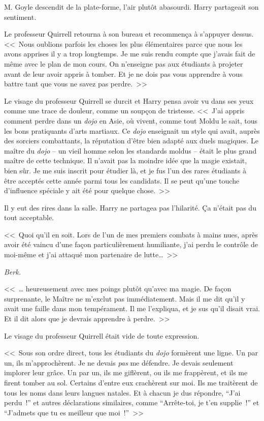 M. Goyle descendit de la plate-forme, l'air plutôt abasourdi. Harry partageait son sentiment.

Le professeur Quirrell retourna à son bureau et recommença à s'appuyer dessus. <<~Nous oublions parfois les choses les plus élémentaires parce que nous les avons apprises il y a trop longtemps. Je me suis rendu compte que j'avais fait de même avec le plan de mon cours. On n'enseigne pas aux étudiants à projeter avant de leur avoir appris à tomber. Et je ne dois pas vous apprendre à vous battre tant que vous ne savez pas perdre.~>>

Le visage du professeur Quirrell se durcit et Harry pensa avoir vu dans ses yeux comme une trace de douleur, comme un soupçon de tristesse. <<~J'ai appris comment perdre dans un \emph{dojo} en Asie, où vivent, comme tout Moldu le sait, tous les bons pratiquants d'arts martiaux. Ce \emph{dojo} enseignait un style qui avait, auprès des sorciers combattants, la réputation d'être bien adapté aux duels magiques. Le maître du \emph{dojo} -- un vieil homme selon les standards moldus -- était le plus grand maître de cette technique. Il n'avait pas la moindre idée que la magie existait, bien sûr. Je me suis inscrit pour étudier là, et je fus l'un des rares étudiants à être acceptés cette année parmi tous les candidats. Il se peut qu'une touche d'influence spéciale y ait été pour quelque chose.~>>

Il y eut des rires dans la salle. Harry ne partagea pas l'hilarité. Ça n'était pas du tout acceptable.

<<~Quoi qu'il en soit. Lors de l'un de mes premiers combats à mains nues, après avoir été vaincu d'une façon particulièrement humiliante, j'ai perdu le contrôle de moi-même et j'ai attaqué mon partenaire de lutte…~>>

\emph{Berk.}

<<~… heureusement avec mes poings plutôt qu'avec ma magie. De façon surprenante, le Maître ne m'exclut pas immédiatement. Mais il me dit qu'il y avait une faille dans mon tempérament. Il me l'expliqua, et je sus qu'il disait vrai. Et il dit alors que je devrais apprendre à perdre.~>>

Le visage du professeur Quirrell était vide de toute expression.

<<~Sous son ordre direct, tous les étudiants du \emph{dojo} formèrent une ligne. Un par un, ils m'approchèrent. Je ne devais \emph{pas} me défendre. Je devais seulement implorer leur grâce. Un par un, ils me giflèrent, ou ils me frappèrent, et ils me firent tomber au sol. Certains d'entre eux crachèrent sur moi. Ils me traitèrent de tous les noms dans leurs langues natales. Et à chacun je dus répondre, “J'ai perdu~!” et autres déclarations similaires, comme “Arrête-toi, je t'en supplie~!” et “J'admets que tu es meilleur que moi~!”~>>

